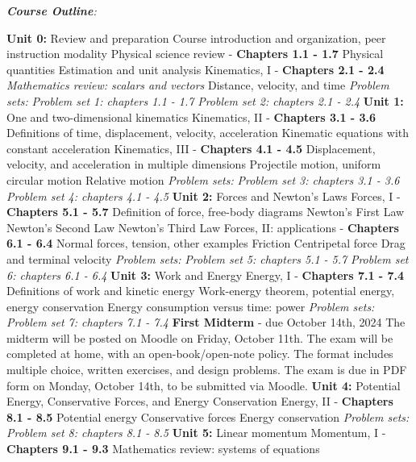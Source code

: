 \documentclass[10pt]{article}
\begin{document}
\clearpage
\twocolumn
\noindent
\textit{\textbf{Course Outline}:}
\begin{outline}[enumerate]
\1 \textbf{Unit 0:} Review and preparation 
\2 Course introduction and organization, peer instruction modality
\2 Physical science review - \textbf{Chapters 1.1 - 1.7}
\3 Physical quantities
\3 Estimation and unit analysis
\2 Kinematics, I - \textbf{Chapters 2.1 - 2.4}
\3 \textit{Mathematics review: scalars and vectors}
\3 Distance, velocity, and time
\2 \textit{Problem sets:}
\3 \textit{Problem set 1: chapters 1.1 - 1.7}
\3 \textit{Problem set 2: chapters 2.1 - 2.4}
\1 \textbf{Unit 1:} One and two-dimensional kinematics
\2 Kinematics, II - \textbf{Chapters 3.1 - 3.6}
\3 Definitions of time, displacement, velocity, acceleration
\3 Kinematic equations with constant acceleration
\2 Kinematics, III - \textbf{Chapters 4.1 - 4.5}
\3 Displacement, velocity, and acceleration in multiple dimensions
\3 Projectile motion, uniform circular motion
\3 Relative motion
\2 \textit{Problem sets:}
\3 \textit{Problem set 3: chapters 3.1 - 3.6}
\3 \textit{Problem set 4: chapters 4.1 - 4.5}
\1 \textbf{Unit 2:} Forces and Newton's Laws
\2 Forces, I - \textbf{Chapters 5.1 - 5.7}
\3 Definition of force, free-body diagrams
\3 Newton's First Law
\3 Newton's Second Law
\3 Newton's Third Law
\2 Forces, II: applications - \textbf{Chapters 6.1 - 6.4}
\3 Normal forces, tension, other examples
\3 Friction
\3 Centripetal force
\3 Drag and terminal velocity
\2 \textit{Problem sets:}
\3 \textit{Problem set 5: chapters 5.1 - 5.7}
\3 \textit{Problem set 6: chapters 6.1 - 6.4}
\1 \textbf{Unit 3:} Work and Energy
\2 Energy, I - \textbf{Chapters 7.1 - 7.4}
\3 Definitions of work and kinetic energy
\3 Work-energy theorem, potential energy, energy conservation
\3 Energy consumption versus time: power
\2 \textit{Problem sets:}
\3 \textit{Problem set 7: chapters 7.1 - 7.4}
\1 \textbf{First Midterm} - due October 14th, 2024
\2 The midterm will be posted on Moodle on Friday, October 11th.
\2 The exam will be completed at home, with an open-book/open-note policy.  The format includes multiple choice, written exercises, and design problems.
\2 The exam is due in PDF form on Monday, October 14th, to be submitted via Moodle.
\1 \textbf{Unit 4:} Potential Energy, Conservative Forces, and Energy Conservation
\2 Energy, II - \textbf{Chapters 8.1 - 8.5}
\3 Potential energy
\3 Conservative forces
\3 Energy conservation
\3 \textit{Problem sets:}
\4 \textit{Problem set 8: chapters 8.1 - 8.5}
\1 \textbf{Unit 5:} Linear momentum
\2 Momentum, I - \textbf{Chapters 9.1 - 9.3}
\3 Mathematics review: systems of equations

\end{outline}
\end{document}
